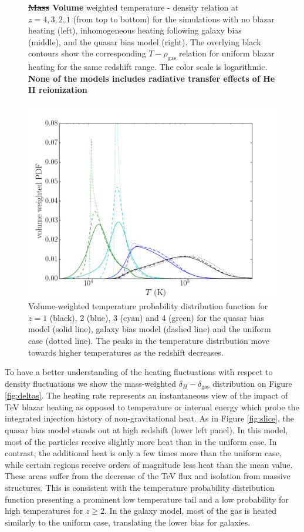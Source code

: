 \documentclass[numberedappendix]{emulateapj}
\newcommand\ALc[1]{{\color{red} \bf #1}} %
\begin{document}
\begin{figure}
\caption{\ALc{\sout{Mass} Volume} weighted temperature - density relation at $z=4,3,2,1$ (from top to bottom) for the simulations with no blazar heating (left), inhomogeneous heating following galaxy bias (middle), and the quasar bias model (right). The overlying black contours show the corresponding $T-\rho_{\mathrm{gas}}$ relation for uniform blazar heating \citep{2012MNRAS.423..149P} for the same redshift range. The color scale is logarithmic. \ALc{None of the models includes radiative transfer effects of He\,\textsc{II} reionization}}
\label{fig:T_rho}
\end{figure}

\begin{figure}[h]
\centering
\includegraphics[width = .45\textwidth ]{full_PDF_256_gal_qso.pdf}
\caption{Volume-weighted temperature probability distribution function for $z=1$ (black), 2 (blue), 3 (cyan) and 4 (green) for the quasar bias model (solid line), galaxy bias model (dashed line) and the uniform case (dotted line). The peaks in the temperature distribution move towards higher temperatures as the redshift decreases.}
\label{fig:PDF}
\end{figure}
To have a better understanding of the heating fluctuations with respect to density fluctuations we show the mass-weighted $\delta_H-\delta_{\mathrm{gas}}$ distribution on Figure \ref{fig:deltas}. The heating rate represents an instantaneous view of the impact of TeV blazar heating as opposed to temperature or internal energy which probe the integrated injection history of non-gravitational heat. As in Figure \ref{fig:slice}, the quasar bias model stands out at high redshift (lower left panel).  In this model, most of the particles receive slightly more heat than in the uniform case. In contrast, the additional heat is only a few times more than the uniform case, while certain regions receive orders of magnitude less heat than the mean value. These areas suffer from the decrease of the TeV flux and isolation from massive structures. This is consistent with the temperature probability distribution function presenting a prominent low temperature tail and a low probability for high temperatures for $z\geqslant 2$. In the galaxy model, most of the gas is heated similarly to the uniform case, translating the lower bias for galaxies.
\end{document}
